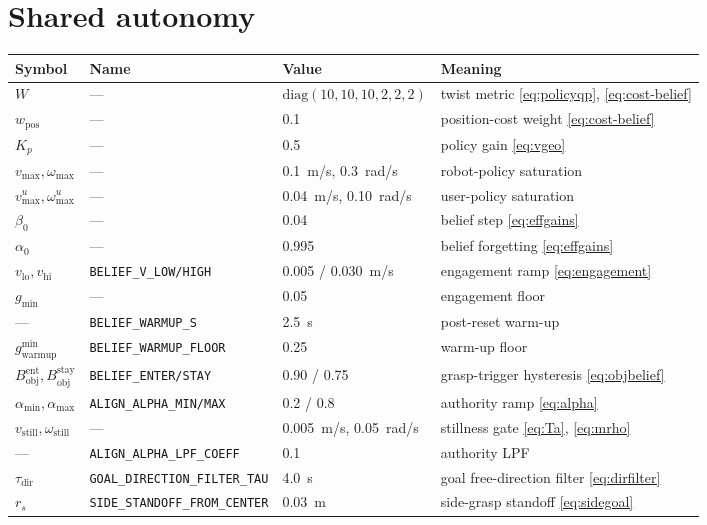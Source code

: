 \section{Shared autonomy}
\begin{tabularx}{\linewidth}{@{}l>{\scriptsize}ll>{\raggedright\arraybackslash}X@{}}
\toprule
Symbol & Name & Value & Meaning \\
\midrule
$W$ & --- & $\mathrm{diag}(10,10,10,2,2,2)$ & twist metric \eqref{eq:policyqp}, \eqref{eq:cost-belief} \\
$w_{\text{pos}}$ & --- & 0.1 & position-cost weight \eqref{eq:cost-belief} \\
$K_p$ & --- & 0.5 & policy gain \eqref{eq:vgeo} \\
$v_{\max},\omega_{\max}$ & --- & 0.1~m/s, 0.3~rad/s & robot-policy saturation \\
$v_{\max}^{u},\omega_{\max}^{u}$ & --- & 0.04~m/s, 0.10~rad/s & user-policy saturation \\
$\beta_0$ & --- & 0.04 & belief step \eqref{eq:effgains} \\
$\alpha_0$ & --- & 0.995 & belief forgetting \eqref{eq:effgains} \\
$v_{\text{lo}}, v_{\text{hi}}$ & \texttt{BELIEF\_V\_LOW/HIGH} & 0.005 / 0.030~m/s & engagement ramp \eqref{eq:engagement} \\
$g_{\min}$ & --- & 0.05 & engagement floor \\
--- & \texttt{BELIEF\_WARMUP\_S} & 2.5~s & post-reset warm-up \\
$g_{\text{warmup}}^{\min}$ & \texttt{BELIEF\_WARMUP\_FLOOR} & 0.25 & warm-up floor \\
$B_{\text{obj}}^{\text{ent}}, B_{\text{obj}}^{\text{stay}}$ & \texttt{BELIEF\_ENTER/STAY} & 0.90 / 0.75 & grasp-trigger hysteresis \eqref{eq:objbelief} \\
$\alpha_{\min},\alpha_{\max}$ & \texttt{ALIGN\_ALPHA\_MIN/MAX} & 0.2 / 0.8 & authority ramp \eqref{eq:alpha} \\
$v_{\text{still}},\omega_{\text{still}}$ & --- & 0.005~m/s, 0.05~rad/s & stillness gate \eqref{eq:Ta}, \eqref{eq:mrho} \\
--- & \texttt{ALIGN\_ALPHA\_LPF\_COEFF} & 0.1 & authority LPF \\
$\tau_{\text{dir}}$ & \texttt{GOAL\_DIRECTION\_FILTER\_TAU} & 4.0~s & goal free-direction filter \eqref{eq:dirfilter} \\
$r_s$ & \texttt{SIDE\_STANDOFF\_FROM\_CENTER} & 0.03~m & side-grasp standoff \eqref{eq:sidegoal} \\

\end{tabularx}
